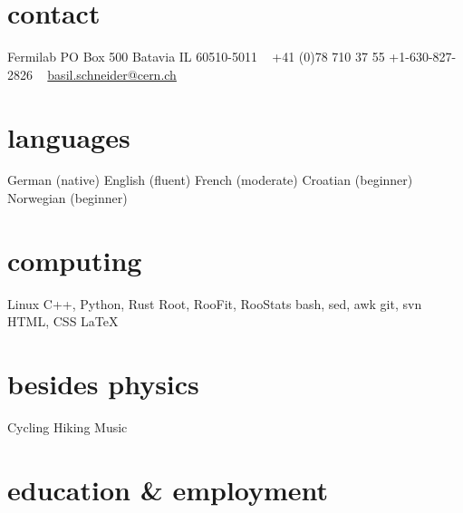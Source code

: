 \documentclass[]{cv} %
\begin{document}


\begin{aside} %
  \section{contact}
  Fermilab
  PO Box 500
  Batavia IL 60510-5011
  ~
  +41 (0)78 710 37 55
  +1-630-827-2826
  ~
  \href{mailto:basil.schneider@cern.ch}{basil.schneider@cern.ch}
  \section{languages}
  German (native)
  English (fluent)
  French (moderate)
  Croatian (beginner)
  Norwegian (beginner)
  \section{computing}
  Linux
  C++, Python, Rust
  Root, RooFit, RooStats
  bash, sed, awk
  git, svn
  HTML, CSS
  \LaTeX
  \section{besides physics}
  Cycling
  Hiking
  Music
\end{aside}


\section{education \& employment}
\end{document}

